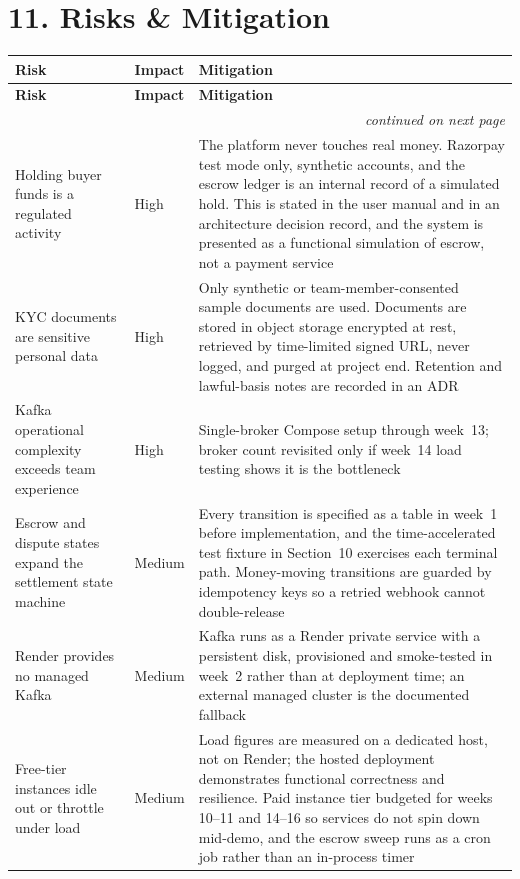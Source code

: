 \documentclass[11pt, a4paper]{article}
\newcommand{\secgap}{\vspace{0.06in}}
\begin{document}
\secgap
\newpage
\section*{11. Risks \& Mitigation}
{\small
\begin{longtable}{@{}p{1.65in} p{0.7in} p{3.2in}@{}}
\toprule
\textbf{Risk} & \textbf{Impact} & \textbf{Mitigation} \\
\midrule
\endfirsthead
\toprule
\textbf{Risk} & \textbf{Impact} & \textbf{Mitigation} \\
\midrule
\endhead
\midrule
\multicolumn{3}{r}{\footnotesize\emph{continued on next page}}\\
\endfoot
\bottomrule
\endlastfoot
Holding buyer funds is a regulated activity & High & The platform never touches real money. Razorpay test mode only, synthetic accounts, and the escrow ledger is an internal record of a simulated hold. This is stated in the user manual and in an architecture decision record, and the system is presented as a functional simulation of escrow, not a payment service \\
KYC documents are sensitive personal data & High & Only synthetic or team-member-consented sample documents are used. Documents are stored in object storage encrypted at rest, retrieved by time-limited signed URL, never logged, and purged at project end. Retention and lawful-basis notes are recorded in an ADR \\
Kafka operational complexity exceeds team experience & High & Single-broker Compose setup through week~13; broker count revisited only if week~14 load testing shows it is the bottleneck \\
Escrow and dispute states expand the settlement state machine & Medium & Every transition is specified as a table in week~1 before implementation, and the time-accelerated test fixture in Section~10 exercises each terminal path. Money-moving transitions are guarded by idempotency keys so a retried webhook cannot double-release \\
Render provides no managed Kafka & Medium & Kafka runs as a Render private service with a persistent disk, provisioned and smoke-tested in week~2 rather than at deployment time; an external managed cluster is the documented fallback \\
Free-tier instances idle out or throttle under load & Medium & Load figures are measured on a dedicated host, not on Render; the hosted deployment demonstrates functional correctness and resilience. Paid instance tier budgeted for weeks 10--11 and 14--16 so services do not spin down mid-demo, and the escrow sweep runs as a cron job rather than an in-process timer \\

\end{longtable}}
\end{document}

